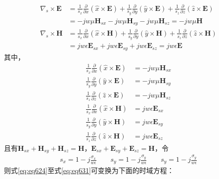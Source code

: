 \documentclass{article}
\numberwithin{equation}{section}
\begin{document}
\begin{align}
    \label{eq:eq623}
    \nabla_s \times \mathbf{E}&=\frac{1}{s_x}\frac{\partial}{\partial x}(\hat{x}\times\mathbf{E})+\frac{1}{s_y}\frac{\partial}{\partial y}(\hat{y}\times\mathbf{E})+\frac{1}{s_z}\frac{\partial}{\partial z}(\hat{z}\times\mathbf{E}) \nonumber \\
                              &=-jw\mu\mathbf{H}_{sx}-jw\mu\mathbf{H}_{sy}-jw\mu\mathbf{H}_{sz}=-jw\mu\mathbf{H} \\
    \label{eq:eq628}
    \nabla_s \times \mathbf{H}&=\frac{1}{s_x}\frac{\partial}{\partial x}(\hat{x}\times\mathbf{H})+\frac{1}{s_y}\frac{\partial}{\partial y}(\hat{y}\times\mathbf{H})+\frac{1}{s_z}\frac{\partial}{\partial z}(\hat{z}\times\mathbf{H}) \nonumber \\
                              &=jw\epsilon\mathbf{E}_{sx}+jw\epsilon\mathbf{E}_{sy}+jw\epsilon\mathbf{E}_{sz}=jw\epsilon\mathbf{E}
\end{align}
其中，
\begin{align}
    \label{eq:eq624}
    \frac{1}{s_x}\frac{\partial}{\partial x}(\hat{x}\times\mathbf{E})&=-jw\mu\mathbf{H}_{sx} \\
    \label{eq:eq625}
    \frac{1}{s_y}\frac{\partial}{\partial y}(\hat{y}\times\mathbf{E})&=-jw\mu\mathbf{H}_{sy} \\
    \label{eq:eq626}
    \frac{1}{s_z}\frac{\partial}{\partial z}(\hat{z}\times\mathbf{E})&=-jw\mu\mathbf{H}_{sz} \\
    \label{eq:eq629}
    \frac{1}{s_x}\frac{\partial}{\partial x}(\hat{x}\times\mathbf{H})&=jw\epsilon\mathbf{E}_{sx} \\
    \label{eq:eq630}
    \frac{1}{s_y}\frac{\partial}{\partial y}(\hat{y}\times\mathbf{H})&=jw\epsilon\mathbf{E}_{sy} \\
    \label{eq:eq631}
    \frac{1}{s_z}\frac{\partial}{\partial z}(\hat{z}\times\mathbf{H})&=jw\epsilon\mathbf{E}_{sz}
\end{align}
且有$\mathbf{H}_{sx}+\mathbf{H}_{sy}+\mathbf{H}_{sz}=\mathbf{H}$，$\mathbf{E}_{sx}+\mathbf{E}_{sy}+\mathbf{E}_{sz}=\mathbf{H}$，令
\begin{align}
    \label{eq:eq627}
    s_x=1-j\frac{\sigma_x}{w\epsilon}\qquad s_y=1-j\frac{\sigma_y}{w\epsilon}\qquad s_y=1-j\frac{\sigma_y}{w\epsilon}
\end{align}
则式\ref{eq:eq624}至式\ref{eq:eq631}可变换为下面的时域方程：
\end{document}
